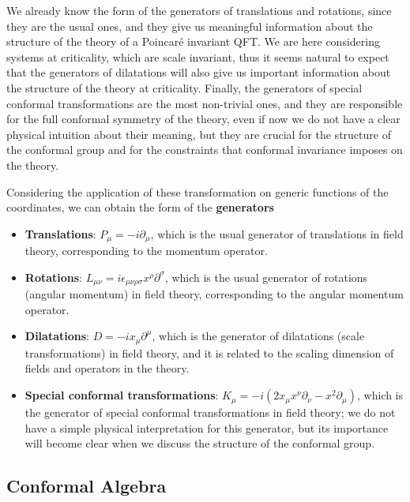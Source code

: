 We already know the form of the generators of translations and rotations, since they are the usual ones, and they give us meaningful information about the structure of the theory of a Poincar\'e invariant QFT. We are here considering systems at criticality, which are scale invariant, thus it seems natural to expect that the generators of dilatations will also give us important information about the structure of the theory at criticality. Finally, the generators of special conformal transformations are the most non-trivial ones, and they are responsible for the full conformal symmetry of the theory, even if now we do not have a clear physical intuition about their meaning, but they are crucial for the structure of the conformal group and for the constraints that conformal invariance imposes on the theory.

Considering the application of these transformation on generic functions of the coordinates, we can obtain the form of the \textbf{generators}
\begin{itemize}
    \item \textbf{Translations}: \(P_{\mu}=-i\partial_{\mu}\), which is the usual generator of translations in field theory, corresponding to the momentum operator.
    \item \textbf{Rotations}: \(L_{\mu\nu}=i\epsilon_{\mu\nu\rho\sigma}x^{\rho}\partial^{\sigma}\), which is the usual generator of rotations (angular momentum) in field theory, corresponding to the angular momentum operator.
    \item \textbf{Dilatations}: \(D=-ix_{\mu}\partial^{\mu}\), which is the generator of dilatations (scale transformations) in field theory, and it is related to the scaling dimension of fields and operators in the theory.
    \item \textbf{Special conformal transformations}: \(K_{\mu}=-i(2x_{\mu}x^{\nu}\partial_{\nu}-x^{2}\partial_{\mu})\), which is the generator of special conformal transformations in field theory; we do not have a simple physical interpretation for this generator, but its importance will become clear when we discuss the structure of the conformal group.
\end{itemize}

\subsection{Conformal Algebra}

